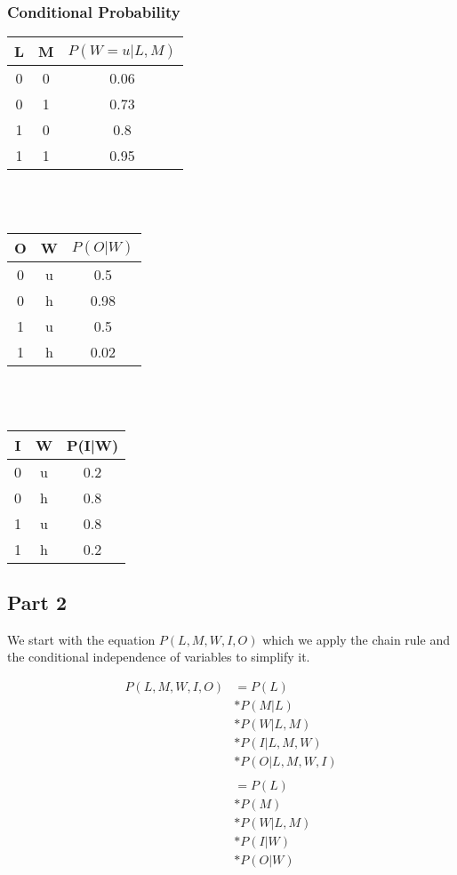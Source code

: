 \documentclass[a4paper, 12pt]{article}
\begin{document}
			\subsubsection{Conditional Probability}
			\begin{tabular}{|c|c|c|}
				\hline
				L & M & $P(W=u|L,M)$\\
				\hline
				0 & 0 & 0.06\\
				0 & 1 & 0.73\\
				1 & 0 & 0.8\\
				1 & 1 & 0.95\\
				\hline
			\end{tabular}
			\\\\
			\begin{tabular}{|c|c|c|}
				\hline
				O & W & $P(O|W)$\\
				\hline
				0 & u & 0.5\\
				0 & h & 0.98\\
				1 & u & 0.5\\
				1 & h & 0.02\\
				\hline
			\end{tabular}
			\\\\
			\begin{tabular}{|c|c|c|}
				\hline
				I & W & P(I|W)\\
				\hline
				0 & u & 0.2\\
				0 & h & 0.8\\
				1 & u & 0.8\\
				1 & h & 0.2\\
				\hline
			\end{tabular}
			
		\subsection{Part 2}
			We start with the equation $P(L,M,W,I,O)$ which we apply the chain rule and the conditional independence of variables to simplify it.	
		
			\begin{equation*}
				\begin{split}
					P(L,M,W,I,O) & = P(L)
					\\
					& * P(M|L)
					\\
					& * P(W|L,M)
					\\
					& * P(I|L,M,W)
					\\
					& * P(O|L,M,W,I)
					\\\\
					& = P(L)
					\\
					& * P(M)
					\\
					& * P(W|L,M)
					\\
					& * P(I|W)
					\\
					& * P(O|W)
				\end{split}
			\end{equation*}		
		
\end{document}
